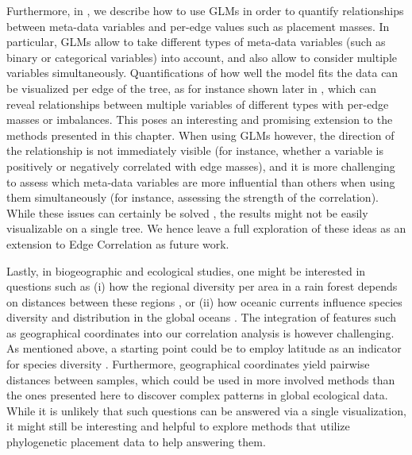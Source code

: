 Furthermore, in , we describe how to use \acfp{GLM}
in order to quantify relationships between meta-data variables and per-edge values such as placement masses.
In particular, \acp{GLM} allow to take different types of meta-data variables
(such as binary or categorical variables) into account, and also allow to consider multiple variables simultaneously.
Quantifications of how well the model fits the data can be visualized per edge of the tree,
as for instance shown later in ,
which can reveal relationships between multiple variables of different types with per-edge masses or imbalances.
This poses an interesting and promising extension to the methods presented in this chapter.
When using \acp{GLM} however, the direction of the relationship is not immediately visible
(for instance, whether a variable is positively or negatively correlated with edge masses),
and it is more challenging to assess which meta-data variables are more influential than others
when using them simultaneously (for instance, assessing the strength of the correlation).
While these issues can certainly be solved \cite{Gevrey2003},
the results might not be easily visualizable on a single tree.
We hence leave a full exploration of these ideas as an extension to Edge Correlation as future work.

Lastly, in biogeographic and ecological studies, one might be interested in questions such as
(i) how the regional diversity per area in a rain forest depends on distances between these regions \cite{Lentendu2018},
or (ii) how oceanic currents influence species diversity and distribution in the global oceans \cite{Sunagawa2015}.
The integration of features such as geographical coordinates into our correlation analysis is however challenging.
As mentioned above, a starting point could be to employ latitude as an indicator for species diversity \cite{Sunagawa2015}.
Furthermore, geographical coordinates yield pairwise distances between samples,
which could be used in more involved methods than the ones presented here
to discover complex patterns in global ecological data.
While it is unlikely that such questions can be answered via a single visualization,
it might still be interesting and helpful to explore methods
that utilize phylogenetic placement data to help answering them.
